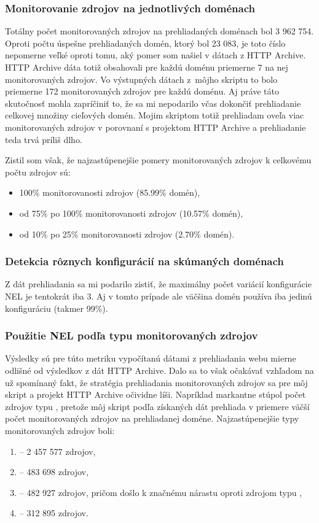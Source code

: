 \subsubsection{Monitorovanie zdrojov na jednotlivých doménach}

Totálny počet monitorovaných zdrojov na prehliadaných doménach bol 3 962 754.
Oproti počtu úspešne prehliadaných domén, ktorý bol 23 083, je toto číslo nepomerne veľké oproti tomu, aký pomer som našiel v dátach z HTTP Archive.
HTTP Archive dáta totiž obsahovali pre každú doménu priemerne 7 na nej monitorovaných zdrojov.
Vo výstupných dátach \mbox{z môjho} skriptu to bolo priemerne 172 monitorovaných zdrojov pre každú doménu.  
Aj práve táto skutočnosť mohla zapríčiniť to, že sa mi nepodarilo včas dokončiť prehliadanie celkovej množiny cieľových domén. 
Mojim skriptom totiž prehliadam oveľa viac monitorovaných zdrojov v porovnaní s projektom HTTP Archive a prehliadanie teda trvá príliš dlho.

Zistil som však, že najzastúpenejšie pomery monitorovaných zdrojov k celkovému počtu zdrojov sú:
\begin{itemize}
    \item 100\% monitorovanosti zdrojov (85.99\% domén),
    \item od 75\% po 100\% monitorovanosti zdrojov (10.57\% domén),
    \item od 10\% po 25\% monitorovanosti zdrojov (2.70\% domén).
\end{itemize}

\subsubsection{Detekcia rôznych konfigurácií na skúmaných doménach}

Z dát prehliadania sa mi podarilo zistiť, že maximálny počet variácií konfigurácie NEL je tentokrát iba 3.
Aj v tomto prípade ale väčšina domén používa iba jedinú konfiguráciu (takmer 99\%).

\subsubsection{Použitie NEL podľa typu monitorovaných zdrojov}

Výsledky sú pre túto metriku vypočítanú dátami z prehliadania webu mierne odlišné od výsledkov z dát HTTP Archive. 
Dalo sa to však očakávať vzhľadom na už spomínaný fakt, že stratégia prehliadania monitorovaných zdrojov sa pre môj skript a projekt HTTP Archive očividne líši.
Napríklad markantne stúpol počet zdrojov typu , pretože môj skript podľa získaných dát prehliada v priemere väčší počet monitorovaných zdrojov na prehliadanej doméne. 
Najzastúpenejšie typy monitorovaných zdrojov boli:
\begin{enumerate}
    \item {} -- 2 457 577 zdrojov,
    \item {} -- 483 698 zdrojov,
    \item {} -- 482 927 zdrojov, pričom došlo k značnému nárastu oproti zdrojom typu ,
    \item {} -- 312 895 zdrojov.
\end{enumerate}
